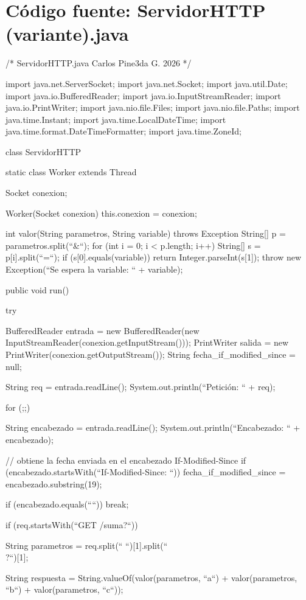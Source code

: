 \documentclass[11pt,a4paper,oneside]{book}
\begin{document}
\chapter{Código fuente: ServidorHTTP (variante).java}
\begin{SourceCode}
/*
  ServidorHTTP.java
  Carlos Pine3da G. 2026
*/

import java.net.ServerSocket;
import java.net.Socket;
import java.util.Date;
import java.io.BufferedReader;
import java.io.InputStreamReader;
import java.io.PrintWriter;
import java.nio.file.Files;
import java.nio.file.Paths;
import java.time.Instant;
import java.time.LocalDateTime;
import java.time.format.DateTimeFormatter;
import java.time.ZoneId;

class ServidorHTTP
{
  static class Worker extends Thread
  {
    Socket conexion;

    Worker(Socket conexion)
    {
      this.conexion = conexion;
    }

    int valor(String parametros, String variable) throws Exception
    {
      String[] p = parametros.split(``&``);
      for (int i = 0; i < p.length; i++)
      {
        String[] s = p[i].split(``=``);
        if (s[0].equals(variable))
          return Integer.parseInt(s[1]);
      }
      throw new Exception(``Se espera la variable: `` + variable);
    }

    public void run()
    {
      try
      {
        BufferedReader entrada = new BufferedReader(new InputStreamReader(conexion.getInputStream()));
        PrintWriter salida = new PrintWriter(conexion.getOutputStream());
        String fecha_if_modified_since = null;

        String req = entrada.readLine();
        System.out.println(``Petición: `` + req);

        for (;;)
        {
          String encabezado = entrada.readLine();
          System.out.println(``Encabezado: `` + encabezado);

          // obtiene la fecha enviada en el encabezado If-Modified-Since
          if (encabezado.startsWith(``If-Modified-Since: ``))
	          fecha_if_modified_since = encabezado.substring(19);

          if (encabezado.equals(````)) break;
        }

        if (req.startsWith(``GET /suma?``))
        {
          String parametros = req.split(`` ``)[1].split(``\\?``)[1];

          String respuesta = String.valueOf(valor(parametros, ``a``) + valor(parametros, ``b``) + valor(parametros, ``c``));

}}}}}
\end{SourceCode}
\end{document}
